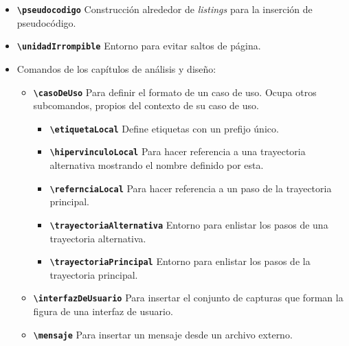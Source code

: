\begin{itemize}
  \item \textbf{\texttt{{\textbackslash}pseudocodigo}}
    Construcción alrededor de \textit{listings} para la inserción de
    pseudocódigo.

  \item \textbf{\texttt{{\textbackslash}unidadIrrompible}}
    Entorno para evitar saltos de página.

  \item Comandos de los capítulos de análisis y diseño:

    \begin{itemize}

      \item \textbf{\texttt{{\textbackslash}casoDeUso}}
        Para definir el formato de un caso de uso. Ocupa otros subcomandos,
        propios del contexto de su caso de uso.

        \begin{itemize}

          \item \textbf{\texttt{{\textbackslash}etiquetaLocal}}
            Define etiquetas con un prefijo único.

          \item \textbf{\texttt{{\textbackslash}hipervinculoLocal}}
            Para hacer referencia a una trayectoria alternativa mostrando
            el nombre definido por esta.

          \item \textbf{\texttt{{\textbackslash}refernciaLocal}}
            Para hacer referencia a un paso de la trayectoria principal.

          \item \textbf{\texttt{{\textbackslash}trayectoriaAlternativa}}
            Entorno para enlistar los pasos de una trayectoria
            alternativa.

          \item \textbf{\texttt{{\textbackslash}trayectoriaPrincipal}}
            Entorno para enlistar los pasos de la trayectoria
            principal.

        \end{itemize}

      \item \textbf{\texttt{{\textbackslash}interfazDeUsuario}}
        Para insertar el conjunto de capturas que forman la figura de una
        interfaz de usuario.

      \item \textbf{\texttt{{\textbackslash}mensaje}}
        Para insertar un mensaje desde un archivo externo.


\end{itemize}
\end{itemize}
